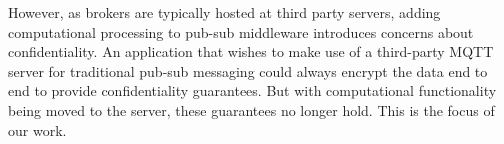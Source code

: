 However, as brokers are typically hosted at third party servers, adding computational processing to pub-sub middleware  introduces concerns about confidentiality. An application that wishes to make use of a third-party MQTT server for traditional pub-sub messaging could always encrypt the data end to end to provide confidentiality guarantees. But with computational functionality being moved to the server, these guarantees no longer hold. This is the focus of our work. 








